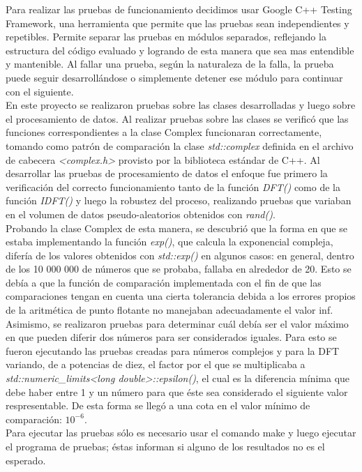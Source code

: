 \documentclass[12pt,a4paper]{report}
\begin{document}
		\indent Para realizar las pruebas de funcionamiento decidimos usar Google C++ Testing Framework, una herramienta que 
		permite que las pruebas sean independientes y repetibles. Permite separar las pruebas en módulos separados, reflejando 
		la estructura del código evaluado y logrando de esta manera que sea mas entendible y mantenible. Al fallar una prueba, 
		según la naturaleza de la falla, la prueba puede seguir desarrollándose o simplemente detener ese módulo para continuar 
		con el siguiente. 	
		\\
		\indent En este proyecto se realizaron pruebas sobre las clases desarrolladas y luego sobre el procesamiento de datos.
		Al realizar pruebas sobre las clases se verificó que las funciones correspondientes a la clase Complex funcionaran 
		correctamente, tomando como patrón de comparación la clase \textit{std::complex} definida en el archivo de cabecera
		\textit{<complex.h>} provisto por la biblioteca estándar de C++. Al desarrollar las pruebas de procesamiento de datos 
		el enfoque fue primero la verificación del correcto funcionamiento tanto de la función \textit{DFT()} como de la 
		función \textit{IDFT()} y luego la robustez del proceso, realizando pruebas que variaban en el volumen de datos 
		pseudo-aleatorios obtenidos con \textit{rand()}.
		\\
		\indent Probando la clase Complex de esta manera, se descubrió que la forma en que se estaba implementando la función
		\textit{exp()},	que calcula la exponencial compleja, difería de los valores obtenidos con \textit{std::exp()} en algunos 
		casos: en general, dentro de los 10 000 000 de números que se probaba, fallaba en alrededor de 20. Esto se debía a que
		la función de comparación implementada con el fin de que las comparaciones tengan en cuenta una cierta tolerancia debida
		a los errores propios de la aritmética de punto flotante no manejaban adecuadamente el valor inf.
		\\
		\indent Asimismo, se realizaron pruebas para determinar cuál debía ser el valor máximo en que pueden diferir dos números
		para ser considerados iguales. Para esto se fueron ejecutando las pruebas creadas para números complejos y para la DFT variando,
		de a potencias de diez, el factor por el que se multiplicaba a \textit{std::numeric\_limits<long double>::epsilon()}, el cual es
		la diferencia mínima que debe	haber	entre 1 y un número para que éste sea considerado el siguiente valor respresentable. 
		De esta forma se llegó a una cota en el valor mínimo de comparación: $10^{-6}$.
		\\
		\indent Para ejecutar las pruebas sólo es necesario usar el comando make y luego ejecutar el programa de pruebas;
		éstas informan si alguno de los resultados no es el esperado.
\end{document}
